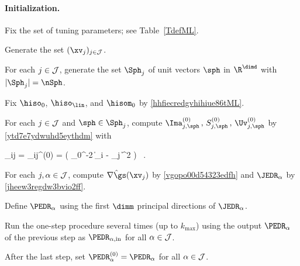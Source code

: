 \paragraph{Initialization.}
\begin{mylist}

\item
Fix the set of tuning parameters; see Table~\ref{TdefML}.

\item
Generate the set \( (\xv_{j})_{j \in \JJJ} \).

\item
For each \( j \in \mathcal{J} \), generate the set \( \Sph_{j} \) of unit vectors \( \sph \) in \( \R^{\dimd} \)
with \( |\Sph_{j}| = \nSph \).

\item
Fix \( \hiso_{0} \), \( \hiso_{\lin} \), and \( \hisom_{0} \) by \eqref{hhfiecredgvhihiue86tML}.

\item 
For each \( j \in \mathcal{J} \) and \( \sph \in \Sph_{j} \), compute  
\( \Ima_{j,\sph}^{(0)} \, , \, S_{j,\sph}^{(0)} \, , \, \Uv_{j,\sph}^{(0)} \)
by \eqref{ytd7e7ydwuhd5eythdm} with 
\begin{EQA}[c]
	\weight_{ij} 
	= 
	\weight_{ij}^{(0)}
	= 
	\Kern\bigl( \hiso_{0}^{-2} \| \Xv_{i} - \xv_{j} \|^{2} \bigr) 
	\, .
\end{EQA}

\item
For each \( j,\alpha \in \mathcal{J} \), compute \( \hat{\nabla \gs}(\xv_{j}) \) by \eqref{vgopo00d54323edfh} and 
\( \JEDR_{\jl} \) by \eqref{jheew3regdw3bvio2ff}.

\item
Define \( \PEDR_{\jl} \) using the first \( \dimm \) principal directions of \( \JEDR_{\jl} \).

\item
Run the one-step procedure several times (up to \( k_{\max} \)) using the output \( \PEDR_{\jl} \)
of the previous step as \( \PEDR_{\jl,\init} \) for all \( \alpha \in \mathcal{J} \).

\item
After the last step, set \( \PEDR_{\jl}^{(0)} = \PEDR_{\jl} \) for all \( \alpha \in \mathcal{J} \).
\end{mylist}


